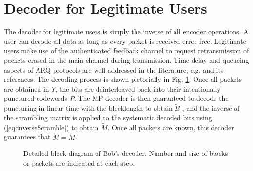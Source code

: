 \documentclass[10pt,twocolumn,twoside]{IEEEtran} \newlength{\pic}
\theoremstyle{definition}
\theoremstyle{remark}
\theoremstyle{plain}
\begin{document}
\section{Decoder for Legitimate Users}\label{sec:decoder}

The decoder for legitimate users is simply the inverse of all encoder operations. A user can decode all data as long as every packet is received error-free. Legitimate users make use of the authenticated feedback channel to request retransmission of packets erased in the main channel during transmission. Time delay and queueing aspects of ARQ protocols are well-addressed in the literature, e.g. \cite{Konheim80} and its references. The decoding process is shown pictorially in Fig. \ref{fig:decoder}. Once all packets are obtained in $Y$, the bits are deinterleaved back into their intentionally punctured codewords $\tilde{P}$. The MP decoder is then guaranteed to decode the puncturing in linear time with the blocklength to obtain $\tilde{B}$ \cite{MoonArches}, and the inverse of the scrambling matrix is applied to the systematic decoded bits using (\ref{eq:inverseScramble}) to obtain $\tilde{M}$. Once all packets are known, this decoder guarantees that $\tilde{M} = M$.


\begin{figure}
\begin{center}
\end{center}
\caption{Detailed block diagram of Bob's decoder. Number and size of blocks or packets are indicated at each step.}\label{fig:decoder}
\end{figure}
\end{document}
